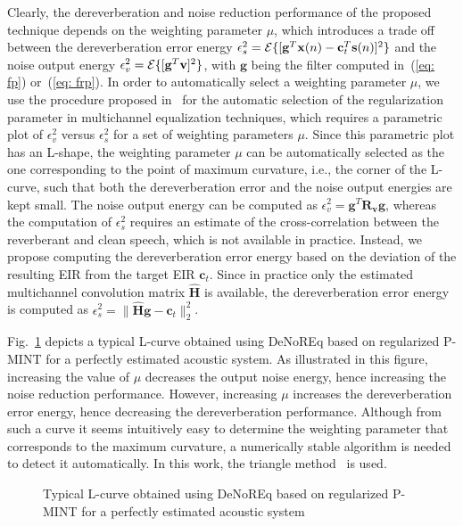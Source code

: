 \documentclass{article}
\begin{document}
Clearly, the dereverberation and noise reduction performance of the proposed technique depends on the weighting parameter $\mu$, which introduces a trade off between the dereverberation error energy $\epsilon_s^2 = {\cal{E}} \{[\mathbf{g}^T\mathbf{x}(n) - \mathbf{c}_t^T\mathbf{s}(n)]^2 \}$ and the noise output energy $\epsilon_v^2 = {\cal{E}} \{[\mathbf{g}^T \mathbf{v}]^2 \}$, with $\mathbf{g}$ being the filter computed in~(\ref{eq: fp}) or~(\ref{eq: frp}).
In order to automatically select a weighting parameter $\mu$, we use the procedure proposed in~\cite{Kodrasi_ITASLP_2013} for the automatic selection of the regularization parameter in multichannel equalization techniques, which requires a parametric plot of $\epsilon_v^2$ versus $\epsilon_s^2$ for a set of weighting parameters $\mu$.
Since this parametric plot has an L-shape, the weighting parameter $\mu$ can be automatically selected as the one corresponding to the point of maximum curvature, i.e., the corner of the L-curve, such that both the dereverberation error and the noise output energies are kept small.
The noise output energy can be computed as $\epsilon_v^2 = \mathbf{g}^T\mathbf{R}_{\mathbf{v}}\mathbf{g}$, whereas the computation of $\epsilon_s^2$ requires an estimate of the cross-correlation between the reverberant and clean speech, which is not available in practice.
Instead, we propose computing the dereverberation error energy based on the deviation of the resulting EIR from the target EIR $\mathbf{c}_t$.
Since in practice only the estimated multichannel convolution matrix $\hat{\mathbf{H}}$ is available, the dereverberation error energy is computed as $\epsilon_s^2 = \|\hat{\mathbf{H}}\mathbf{g} - \mathbf{c}_t \|_2^2$.

Fig.~\ref{fig: lcurveex} depicts a typical L-curve obtained using DeNoREq based on regularized P-MINT for a perfectly estimated acoustic system. 
As illustrated in this figure, increasing the value of $\mu$ decreases the output noise energy, hence increasing the noise reduction performance.
However, increasing $\mu$ increases the dereverberation error energy, hence decreasing the dereverberation performance.
Although from such a curve it seems intuitively easy to determine the weighting parameter that corresponds to the maximum curvature, a numerically stable algorithm is needed to detect it automatically. 
In this work, the triangle method~\cite{Castellanos_2002} is used.
\begin{figure}[t!]
  
  \vspace{-0.22cm}
  \caption{Typical L-curve obtained using DeNoREq based on regularized P-MINT for a perfectly estimated acoustic system}
  \label{fig: lcurveex}
\end{figure}%
\end{document}
